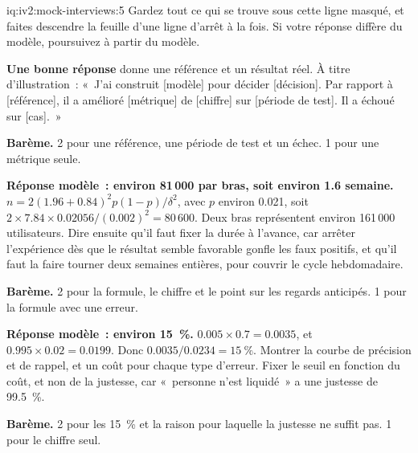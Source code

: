 \begin{solution}{iq:iv2:mock-interviews:5}
Gardez tout ce qui se trouve sous cette ligne masqué, et faites descendre la feuille d'une ligne d'arrêt à la fois. Si votre réponse diffère du modèle, poursuivez à partir du modèle.

\ivstop
\textbf{Une bonne réponse} donne une référence et un résultat réel. À titre d'illustration~: «~J'ai construit [modèle] pour décider [décision]. Par rapport à [référence], il a amélioré [métrique] de [chiffre] sur [période de test]. Il a échoué sur [cas].~»

\textbf{Barème.} 2 pour une référence, une période de test et un échec. 1 pour une métrique seule.

\ivstop
\textbf{Réponse modèle~: environ 81\,000 par bras, soit environ 1.6 semaine.} $n = 2(1.96 + 0.84)^2 p(1 - p)/\delta^2$, avec $p$ environ 0.021, soit $2 \times 7.84 \times 0.02056/(0.002)^2 = 80\,600$. Deux bras représentent environ 161\,000 utilisateurs. Dire ensuite qu'il faut fixer la durée à l'avance, car arrêter l'expérience dès que le résultat semble favorable gonfle les faux positifs, et qu'il faut la faire tourner deux semaines entières, pour couvrir le cycle hebdomadaire.

\textbf{Barème.} 2 pour la formule, le chiffre et le point sur les regards anticipés. 1 pour la formule avec une erreur.

\ivstop
\textbf{Réponse modèle~: environ 15~\%.} $0.005 \times 0.7 = 0.0035$, et $0.995 \times 0.02 = 0.0199$. Donc $0.0035/0.0234 = 15~\%$. Montrer la courbe de précision et de rappel, et un coût pour chaque type d'erreur. Fixer le seuil en fonction du coût, et non de la justesse, car «~personne n'est liquidé~» a une justesse de 99.5~\%.

\textbf{Barème.} 2 pour les 15~\% et la raison pour laquelle la justesse ne suffit pas. 1 pour le chiffre seul.


\end{solution}

